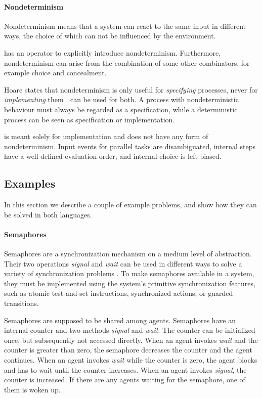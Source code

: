 \paragraph{Nondeterminism}

Nondeterminism means that a system can react to the same input in different ways, the choice of which can not be influenced by the environment.

\CSP has an operator to explicitly introduce nondeterminism.
Furthermore, nondeterminism can arise from the combination of some other combinators, for example choice and concealment.

Hoare states that nondeterminism is only useful for \emph{specifying} processes, never for \emph{implementing} them \cite{books/Hoare85CSP}.
\CSP can be used for both.
A process with nondeterministic behaviour must always be regarded as a specification, while a deterministic process can be seen as specification or implementation.

\TOP is meant solely for implementation and does not have any form of nondeterminism.
Input events for parallel tasks are disambiguated, internal steps have a well-defined evaluation order, and internal choice is left-biased.


\subsection{Examples}

In this section we describe a couple of example problems, and show how they can be solved in both languages.




\paragraph{Semaphores}

Semaphores are a synchronization mechanism on a medium level of abstraction.
Their two operations \emph{signal} and \emph{wait} can be used in different ways to solve a variety of synchronization problems \cite{books/Downey08LBOS}.
To make semaphores available in a system, they must be implemented using the system's primitive synchronization features, such as atomic test-and-set instructions, synchronized actions, or guarded transitions.

Semaphores are supposed to be shared among agents.
Semaphores have an internal counter and two methods \emph{signal} and \emph{wait}.
The counter can be initialized once, but subsequently not accessed directly.
When an agent invokes \emph{wait} and the counter is greater than zero, the semaphore decreases the counter and the agent continues.
When an agent invokes \emph{wait} while the counter is zero, the agent blocks and has to wait until the counter increases.
When an agent invokes \emph{signal}, the counter is increased.
If there are any agents waiting for the semaphore, one of them is woken up.

